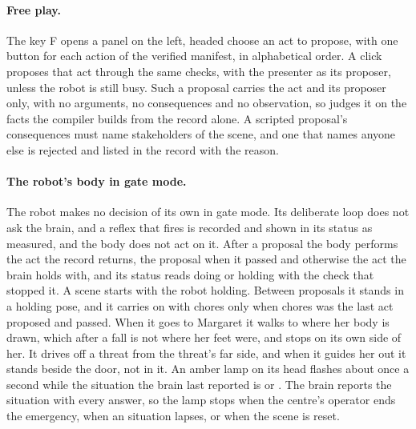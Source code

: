 \paragraph{Free play.}
The key F opens a panel on the left, headed choose an act to propose, with one button for each
action of the verified manifest, in alphabetical order. A click proposes that act through the same checks, with the presenter as its
proposer, unless the robot is still busy. Such a proposal carries the act and its proposer only,
with no arguments, no consequences and no observation, so \deme{} judges it on the facts the
compiler builds from the record alone. A scripted proposal's consequences must name stakeholders of
the scene, and one that names anyone else is rejected and listed in the record with the reason.

\paragraph{The robot's body in gate mode.}
The robot makes no decision of its own in gate mode. Its deliberate loop does not ask the brain,
and a reflex that fires is recorded and shown in its status as measured, and the body does not act
on it. After a proposal the body performs the act the record returns, the proposal when it passed
and otherwise the act the brain holds with, and its status reads doing or holding with the check
that stopped it. A scene starts with the robot holding. Between proposals it stands in a holding
pose, and it carries on with chores only when chores was the last act proposed and passed. When it
goes to Margaret it walks to where her body is drawn, which after a fall is not where her feet
were, and stops on its own side of her. It drives off a threat from the threat's far side, and when
it guides her out it stands beside the door, not in it. An amber lamp on its head flashes about once a
second while the situation the brain last reported is  or . The
brain reports the situation with every answer, so the lamp stops when the centre's operator ends
the emergency, when an  situation lapses, or when the scene is reset.

